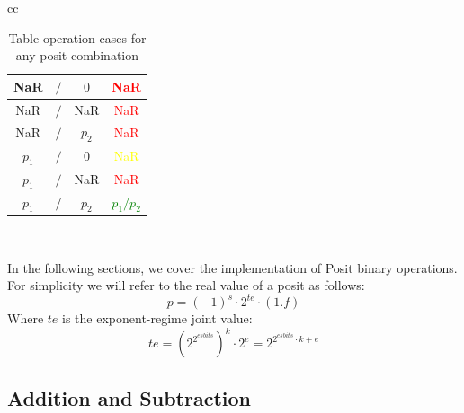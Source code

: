 \begin{table}
\begin{center}
\begin{tabular}{ cc }
\begin{tabular}{||c c c | c||}
    \hline
    NaR & $/$ & $0$ & \textcolor{red}{NaR} \\
    \hline
    NaR & $/$ & NaR & \textcolor{red}{NaR} \\
    \hline
    NaR & $/$ & $p_2$ & \textcolor{red}{NaR} \\ %
    \hline
    $p_1$ & $/$ & $0$ & \textcolor{yellow}{NaR} \\
    \hline
    $p_1$ & $/$ & NaR & \textcolor{red}{NaR} \\
    \hline
    $p_1$ & $/$ & $p_2$ & \textcolor{green}{$p_1 / p_2$} \\
    \hline
\end{tabular} \\
\end{tabular}
\end{center}
\caption{Table operation cases for any posit combination}
\label{table:table_posit_op_combination}
\end{table}





In the following sections, we cover the implementation of Posit binary operations. For simplicity we will refer to the real value of a posit as follows:
\begin{equation}\label{eqn:posit_equation}
    p = (-1)^{s} \cdot 2^{te} \cdot (1.f)
\end{equation}
Where $te$ is the exponent-regime joint value:
\begin{equation}
    te = (2^{2^{esbits}})^{k} \cdot 2^{e} = 2^{2^{esbits}\cdot k + e}
\end{equation}

\subsection{Addition and Subtraction}\label{Addition_and_Subtraction}


